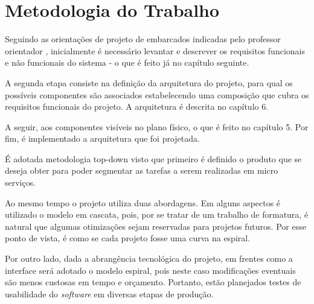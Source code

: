 \chapter{Metodologia do Trabalho}
Seguindo as orientações de projeto de embarcados indicadas pelo professor orientador \cite{apostilaSE}, inicialmente é necessário levantar e descrever os requisitos funcionais e não funcionais do sistema - o que é feito já no capítulo seguinte.

A segunda etapa consiste na definição da arquitetura do projeto, para qual os possíveis componentes são associados estabelecendo uma composição que cubra os requisitos funcionais do projeto. A arquitetura é descrita no capítulo 6.

A seguir, aos componentes visíveis no plano físico, o que é feito no capítulo 5. Por fim, é implementado a arquitetura que foi projetada.

É adotada metodologia top-down visto que primeiro é definido o produto que se deseja obter para poder segmentar as tarefas a serem realizadas em micro serviços.

Ao mesmo tempo o projeto utiliza duas abordagens. Em alguns aspectos é utilizado o modelo em cascata, pois, por se tratar de um trabalho de formatura, é natural que algumas otimizações sejam reservadas para projetos futuros. Por esse ponto de vista, é como se cada projeto fosse uma curva na espiral.

Por outro lado, dada a abrangência tecnológica do projeto, em frentes como a interface será adotado o modelo espiral, pois neste caso modificações eventuais são menos custosas em tempo e orçamento. Portanto, estão planejados testes de usabilidade do \emph{software} em diversas etapas de produção.
